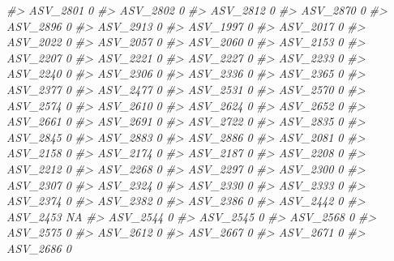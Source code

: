 \documentclass[
]{article}
\newenvironment{Shaded}{\begin{snugshade}}{\end{snugshade}}
\newcommand{\CommentTok}[1]{\textcolor[rgb]{0.56,0.35,0.01}{\textit{#1}}}
\begin{document}
\begin{Shaded}
\begin{Highlighting}[]
\CommentTok{\#\textgreater{} ASV\_2801  0}
\CommentTok{\#\textgreater{} ASV\_2802  0}
\CommentTok{\#\textgreater{} ASV\_2812  0}
\CommentTok{\#\textgreater{} ASV\_2870  0}
\CommentTok{\#\textgreater{} ASV\_2896  0}
\CommentTok{\#\textgreater{} ASV\_2913  0}
\CommentTok{\#\textgreater{} ASV\_1997  0}
\CommentTok{\#\textgreater{} ASV\_2017  0}
\CommentTok{\#\textgreater{} ASV\_2022  0}
\CommentTok{\#\textgreater{} ASV\_2057  0}
\CommentTok{\#\textgreater{} ASV\_2060  0}
\CommentTok{\#\textgreater{} ASV\_2153  0}
\CommentTok{\#\textgreater{} ASV\_2207  0}
\CommentTok{\#\textgreater{} ASV\_2221  0}
\CommentTok{\#\textgreater{} ASV\_2227  0}
\CommentTok{\#\textgreater{} ASV\_2233  0}
\CommentTok{\#\textgreater{} ASV\_2240  0}
\CommentTok{\#\textgreater{} ASV\_2306  0}
\CommentTok{\#\textgreater{} ASV\_2336  0}
\CommentTok{\#\textgreater{} ASV\_2365  0}
\CommentTok{\#\textgreater{} ASV\_2377  0}
\CommentTok{\#\textgreater{} ASV\_2477  0}
\CommentTok{\#\textgreater{} ASV\_2531  0}
\CommentTok{\#\textgreater{} ASV\_2570  0}
\CommentTok{\#\textgreater{} ASV\_2574  0}
\CommentTok{\#\textgreater{} ASV\_2610  0}
\CommentTok{\#\textgreater{} ASV\_2624  0}
\CommentTok{\#\textgreater{} ASV\_2652  0}
\CommentTok{\#\textgreater{} ASV\_2661  0}
\CommentTok{\#\textgreater{} ASV\_2691  0}
\CommentTok{\#\textgreater{} ASV\_2722  0}
\CommentTok{\#\textgreater{} ASV\_2835  0}
\CommentTok{\#\textgreater{} ASV\_2845  0}
\CommentTok{\#\textgreater{} ASV\_2883  0}
\CommentTok{\#\textgreater{} ASV\_2886  0}
\CommentTok{\#\textgreater{} ASV\_2081  0}
\CommentTok{\#\textgreater{} ASV\_2158  0}
\CommentTok{\#\textgreater{} ASV\_2174  0}
\CommentTok{\#\textgreater{} ASV\_2187  0}
\CommentTok{\#\textgreater{} ASV\_2208  0}
\CommentTok{\#\textgreater{} ASV\_2212  0}
\CommentTok{\#\textgreater{} ASV\_2268  0}
\CommentTok{\#\textgreater{} ASV\_2297  0}
\CommentTok{\#\textgreater{} ASV\_2300  0}
\CommentTok{\#\textgreater{} ASV\_2307  0}
\CommentTok{\#\textgreater{} ASV\_2324  0}
\CommentTok{\#\textgreater{} ASV\_2330  0}
\CommentTok{\#\textgreater{} ASV\_2333  0}
\CommentTok{\#\textgreater{} ASV\_2374  0}
\CommentTok{\#\textgreater{} ASV\_2382  0}
\CommentTok{\#\textgreater{} ASV\_2386  0}
\CommentTok{\#\textgreater{} ASV\_2442  0}
\CommentTok{\#\textgreater{} ASV\_2453 NA}
\CommentTok{\#\textgreater{} ASV\_2544  0}
\CommentTok{\#\textgreater{} ASV\_2545  0}
\CommentTok{\#\textgreater{} ASV\_2568  0}
\CommentTok{\#\textgreater{} ASV\_2575  0}
\CommentTok{\#\textgreater{} ASV\_2612  0}
\CommentTok{\#\textgreater{} ASV\_2667  0}
\CommentTok{\#\textgreater{} ASV\_2671  0}
\CommentTok{\#\textgreater{} ASV\_2686  0}

\end{Highlighting}
\end{Shaded}
\end{document}
